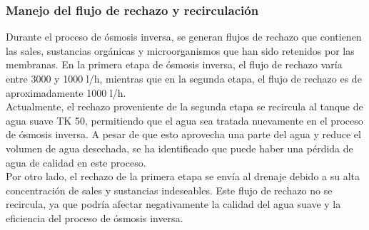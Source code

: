 \subsubsection{Manejo del flujo de rechazo y recirculación}

Durante el proceso de ósmosis inversa, se generan flujos de rechazo que contienen las sales, sustancias orgánicas y microorganismos que han sido retenidos por las membranas. En la primera etapa de ósmosis inversa, el flujo de rechazo varía entre 3000 y 1000 l/h, mientras que en la segunda etapa, el flujo de rechazo es de aproximadamente 1000 l/h.\\

Actualmente, el rechazo proveniente de la segunda etapa se recircula al tanque de agua suave TK 50, permitiendo que el agua sea tratada nuevamente en el proceso de ósmosis inversa. A pesar de que esto aprovecha una parte del agua y reduce el volumen de agua desechada, se ha identificado que puede haber una pérdida de agua de calidad en este proceso.\\

Por otro lado, el rechazo de la primera etapa se envía al drenaje debido a su alta concentración de sales y sustancias indeseables. Este flujo de rechazo no se recircula, ya que podría afectar negativamente la calidad del agua suave y la eficiencia del proceso de ósmosis inversa.\\